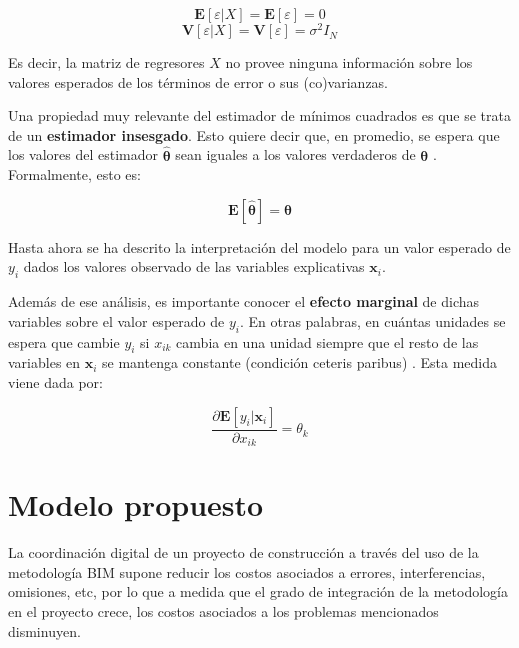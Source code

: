 \begin{equation}
    \bm{E}[\varepsilon|X]=\bm{E}[\varepsilon]=0
\end{equation}
\begin{equation}
    \bm{V}[\varepsilon|X]=\bm{V}[\varepsilon]=\sigma^2I_N
\end{equation}

Es decir, la matriz de regresores $X$ no provee ninguna información sobre los valores esperados de los términos de error o sus (co)varianzas. 

Una propiedad muy relevante del estimador de mínimos cuadrados es que se trata de un \textbf{estimador insesgado}. Esto quiere decir que, en promedio, se espera que los valores del estimador $\bm{\hat\theta}$ sean iguales a los valores verdaderos de $\bm{\theta}$ \cite{verbeek}. Formalmente, esto es:


\begin{equation}
    \bm{E}[\hat{\bm{\theta}}] = \bm{\theta}
\end{equation}

Hasta ahora se ha descrito la interpretación del modelo para un valor esperado de $y_i$ dados los valores observado de las variables explicativas $\bm{x}_i$.

Además de ese análisis, es importante conocer el \textbf{efecto marginal} de dichas variables sobre el valor esperado de $y_i$. En otras palabras, en cuántas unidades se espera que cambie $y_i$ si $x_{ik}$ cambia en una unidad siempre que el resto de las variables en $\bm{x}_i$ se mantenga constante (condición ceteris paribus) \cite{hansen2018}. Esta medida viene dada por:

\begin{equation}
    \label{eq.efec_marginal}
    \frac{\partial \bm{E}[y_i|\bm{x}_i]}{\partial x_{ik}} =\theta_k
\end{equation}

\section{Modelo propuesto}

La coordinación digital de un proyecto de construcción a través del uso de la metodología BIM supone reducir los costos asociados a errores, interferencias, omisiones, etc, por lo que a medida que el grado de integración de la metodología en el proyecto crece, los costos asociados a los problemas mencionados disminuyen.

